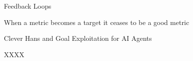 \begin{vbframe}{Feedback Loops}
\end{vbframe}

\begin{vbframe}{When a metric becomes a target it ceases to be a good metric}


\end{vbframe}

\begin{vbframe}{Clever Hans and Goal Exploitation for AI Agents}


\end{vbframe}




\begin{vbframe}{XXXX}


\end{vbframe}


\endlecture

